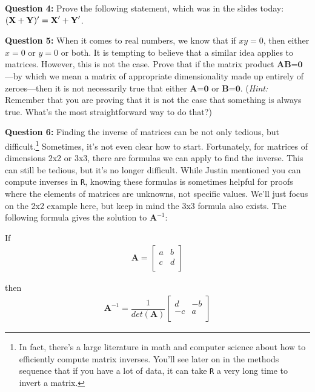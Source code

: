 \documentclass[12pt]{article}
\begin{document}
\medskip
\textbf{Question 4:} Prove the following statement, which was in the slides today: $(\textrm{\textbf{X}}+\textrm{\textbf{Y}})' = \textrm{\textbf{X}}' + \textrm{\textbf{Y}}'$.

\medskip
\textbf{Question 5:} When it comes to real numbers, we know that if $xy=0$, then either $x=0$ or $y=0$ or both. It is tempting to believe that a similar idea applies to matrices. However, this is not the case. Prove that if the matrix product \textbf{AB}=$\textbf{0}$---by which we mean a matrix of appropriate dimensionality made up entirely of zeroes---then it is not necessarily true that either \textbf{A}=$\textbf{0}$ or \textbf{B}=$\textbf{0}$. (\textit{Hint:} Remember that you are proving that it is not the case that something is always true. What's the most straightforward way to do that?)

\bigskip

\textbf{Question 6:} Finding the inverse of matrices can be not only tedious, but difficult.\footnote{In fact, there's a large literature in math and computer science about how to efficiently compute matrix inverses. You'll see later on in the methods sequence that if you have a lot of data, it can take \texttt{R} a very long time to invert a matrix.} Sometimes, it's not even clear how to start. Fortunately, for matrices of dimensions 2x2 or 3x3, there are formulas we can apply to find the inverse. This can still be tedious, but it's no longer difficult. While Justin mentioned you can compute inverses in \texttt{R}, knowing these formulas is sometimes helpful for proofs where the elements of matrices are unknowns, not specific values. We'll just focus on the 2x2 example here, but keep in mind the 3x3 formula also exists. The following formula gives the solution to $\mathbf{A}^{-1}$:

If\\

\begin{eqnarray*}
 \mathbf{A}=
\begin{bmatrix} 
a&b  \\
c&d\\
\end{bmatrix}
\end{eqnarray*}

then\\

\begin{eqnarray*}
 \mathbf{A}^{-1}=\dfrac{1}{det(\mathbf{A})}
\begin{bmatrix} 
d&-b  \\
-c&a\\
\end{bmatrix}
\end{eqnarray*}
\end{document}
